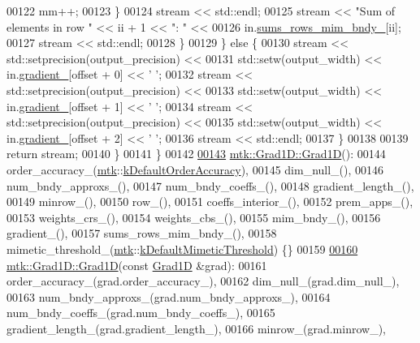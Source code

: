 \begin{DoxyCode}
00122         mm++;
00123       \}
00124       stream << std::endl;
00125       stream << \textcolor{stringliteral}{"Sum of elements in row "} << ii + 1 << \textcolor{stringliteral}{": "} <<
00126         in.\hyperlink{classmtk_1_1Grad1D_ab8858a35339ed7036083d25b23293737}{sums\_rows\_mim\_bndy\_}[ii];
00127       stream << std::endl;
00128     \}
00129   \} \textcolor{keywordflow}{else} \{
00130     stream << std::setprecision(output\_precision) <<
00131         std::setw(output\_width) << in.\hyperlink{classmtk_1_1Grad1D_a024b84b1ea285c0c590eb42d40ff4469}{gradient\_}[offset + 0] << \textcolor{charliteral}{' '};
00132     stream << std::setprecision(output\_precision) <<
00133         std::setw(output\_width) << in.\hyperlink{classmtk_1_1Grad1D_a024b84b1ea285c0c590eb42d40ff4469}{gradient\_}[offset + 1] << \textcolor{charliteral}{' '};
00134     stream << std::setprecision(output\_precision) <<
00135         std::setw(output\_width) << in.\hyperlink{classmtk_1_1Grad1D_a024b84b1ea285c0c590eb42d40ff4469}{gradient\_}[offset + 2] << \textcolor{charliteral}{' '};
00136     stream << std::endl;
00137   \}
00138 
00139   \textcolor{keywordflow}{return} stream;
00140 \}
00141 \}
00142 
\hypertarget{mtk__grad__1d_8cc_source_l00143}{}\hyperlink{classmtk_1_1Grad1D_ae21e6ac2652e653c48f15b304ee83a75}{00143} \hyperlink{classmtk_1_1Grad1D_ae21e6ac2652e653c48f15b304ee83a75}{mtk::Grad1D::Grad1D}():
00144   order\_accuracy\_(\hyperlink{namespacemtk}{mtk}::\hyperlink{group__c01-roots_ga0d95560098eb36420511103637b6952f}{kDefaultOrderAccuracy}),
00145   dim\_null\_(),
00146   num\_bndy\_approxs\_(),
00147   num\_bndy\_coeffs\_(),
00148   gradient\_length\_(),
00149   minrow\_(),
00150   row\_(),
00151   coeffs\_interior\_(),
00152   prem\_apps\_(),
00153   weights\_crs\_(),
00154   weights\_cbs\_(),
00155   mim\_bndy\_(),
00156   gradient\_(),
00157   sums\_rows\_mim\_bndy\_(),
00158   mimetic\_threshold\_(\hyperlink{namespacemtk}{mtk}::\hyperlink{group__c01-roots_ga35718d949bdc81a08a9cc8ebbe3478a2}{kDefaultMimeticThreshold}) \{\}
00159 
\hypertarget{mtk__grad__1d_8cc_source_l00160}{}\hyperlink{classmtk_1_1Grad1D_a5708bcb61bde3f7f3a4ddede191d82a4}{00160} \hyperlink{classmtk_1_1Grad1D_ae21e6ac2652e653c48f15b304ee83a75}{mtk::Grad1D::Grad1D}(\textcolor{keyword}{const} \hyperlink{classmtk_1_1Grad1D}{Grad1D} &grad):
00161   order\_accuracy\_(grad.order\_accuracy\_),
00162   dim\_null\_(grad.dim\_null\_),
00163   num\_bndy\_approxs\_(grad.num\_bndy\_approxs\_),
00164   num\_bndy\_coeffs\_(grad.num\_bndy\_coeffs\_),
00165   gradient\_length\_(grad.gradient\_length\_),
00166   minrow\_(grad.minrow\_),

\end{DoxyCode}
